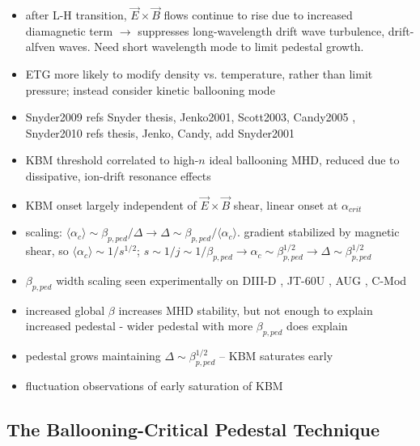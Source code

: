 \begin{itemize}
 \item after L-H transition, $\vec{E}\times\vec{B}$ flows continue to rise due to increased diamagnetic term $\rightarrow$ suppresses long-wavelength drift wave turbulence, drift-alfven waves.  Need short wavelength mode to limit pedestal growth. \cite{Snyder2009}
 \item ETG more likely to modify density vs. temperature, rather than limit pressure; instead consider kinetic ballooning mode \cite{Snyder2009}
 \item Snyder2009 refs Snyder thesis, Jenko2001, Scott2003, Candy2005 \cite{Snyder1999,Jenko2001,Scott2003,Candy2005}, Snyder2010 refs thesis, Jenko, Candy, add Snyder2001 \cite{Snyder2001}
 \item KBM threshold correlated to high-$n$ ideal ballooning MHD, reduced due to dissipative, ion-drift resonance effects \cite{Snyder2009}
 \item KBM onset largely independent of $\vec{E} \times \vec{B}$ shear, linear onset at $\alpha_{crit}$ \cite{Snyder2009}
 \item scaling: $\langle \alpha_c \rangle \sim \beta_{p,ped} / \Delta \rightarrow \Delta \sim \beta_{p,ped}/\langle \alpha_c \rangle$.  gradient stabilized by magnetic shear, so $\langle \alpha_c \rangle \sim 1/s^{1/2}$; $s \sim 1/j \sim 1/\beta_{p,ped} \rightarrow \alpha_c \sim \beta_{p,ped}^{1/2} \rightarrow \Delta \sim \beta_{p,ped}^{1/2}$ \cite{Snyder2009}
 \item $\beta_{p,ped}$ width scaling seen experimentally on DIII-D \cite{Osborne1998,Groebner2013}, JT-60U \cite{Oyama2005,Urano2008}, AUG \cite{Gruber1999,Beurskens2011}, C-Mod \cite{LaBombard2008,Walk2012}
 \item increased global $\beta$ increases MHD stability, but not enough to explain increased pedestal - wider pedestal with more $\beta_{p,ped}$ does explain \cite{Snyder2009a}
 \item pedestal grows maintaining $\Delta \sim \beta_{p,ped}^{1/2}$ -- KBM saturates early \cite{Maggi2010,Hughes2013}
 \item fluctuation observations of early saturation of KBM \cite{Diallo2014}
\end{itemize}

\noindent{}

\subsection{The Ballooning-Critical Pedestal Technique}\label{subsec:mod_bcp}

